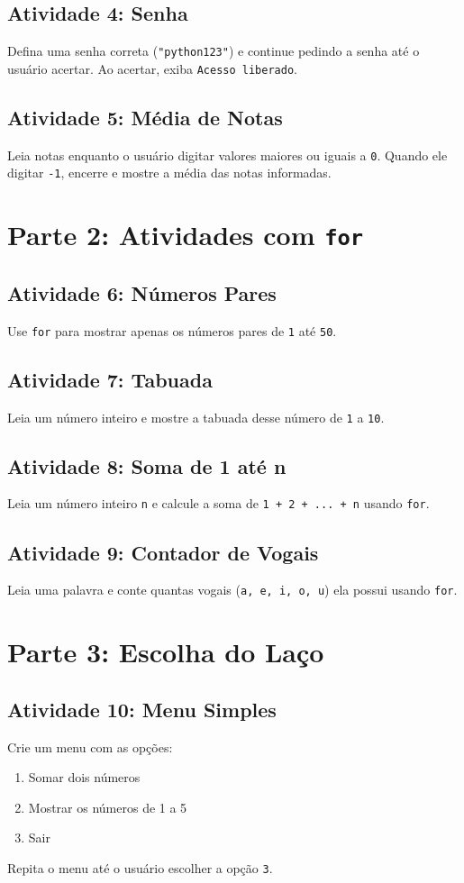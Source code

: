\documentclass[12pt]{article}
\begin{document}
\subsection*{Atividade 4: Senha}
Defina uma senha correta (\texttt{"python123"}) e continue pedindo a senha até o usuário acertar. Ao acertar, exiba \texttt{Acesso liberado}.

\subsection*{Atividade 5: Média de Notas}
Leia notas enquanto o usuário digitar valores maiores ou iguais a \texttt{0}. Quando ele digitar \texttt{-1}, encerre e mostre a média das notas informadas.

\section*{Parte 2: Atividades com \texttt{for}}

\subsection*{Atividade 6: Números Pares}
Use \texttt{for} para mostrar apenas os números pares de \texttt{1} até \texttt{50}.

\subsection*{Atividade 7: Tabuada}
Leia um número inteiro e mostre a tabuada desse número de \texttt{1} a \texttt{10}.

\subsection*{Atividade 8: Soma de 1 até n}
Leia um número inteiro \texttt{n} e calcule a soma de \texttt{1 + 2 + ... + n} usando \texttt{for}.

\subsection*{Atividade 9: Contador de Vogais}
Leia uma palavra e conte quantas vogais (\texttt{a, e, i, o, u}) ela possui usando \texttt{for}.

\section*{Parte 3: Escolha do Laço}

\subsection*{Atividade 10: Menu Simples}
Crie um menu com as opções:
\begin{enumerate}
    \item Somar dois números
    \item Mostrar os números de 1 a 5
    \item Sair
\end{enumerate}
Repita o menu até o usuário escolher a opção \texttt{3}.
\end{document}
